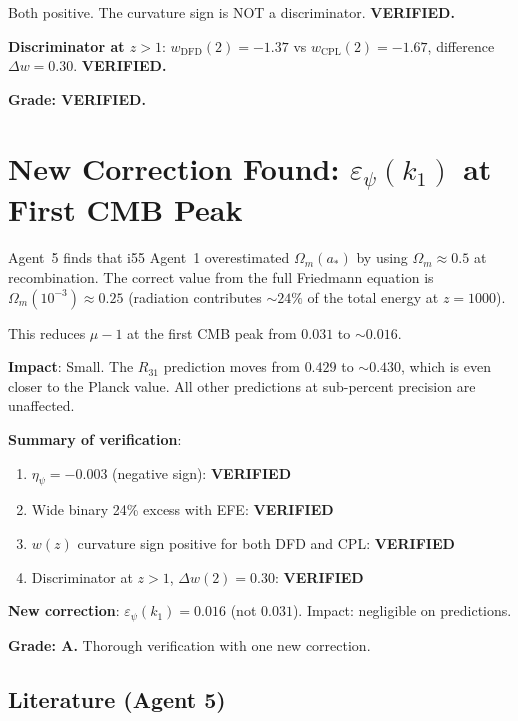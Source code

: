 \documentclass[11pt,a4paper]{article}
\begin{document}
Both positive. The curvature sign is NOT a discriminator. \textbf{VERIFIED.}

\textbf{Discriminator at $z > 1$}: $w_{\mathrm{DFD}}(2) = -1.37$ vs $w_{\mathrm{CPL}}(2) = -1.67$, difference $\Delta w = 0.30$. \textbf{VERIFIED.}

\textbf{Grade: VERIFIED.}

\section{New Correction Found: $\varepsilon_\psi(k_1)$ at First CMB Peak}

Agent~5 finds that i55 Agent~1 overestimated $\Omega_m(a_*)$ by using $\Omega_m \approx 0.5$ at recombination. The correct value from the full Friedmann equation is $\Omega_m(10^{-3}) \approx 0.25$ (radiation contributes $\sim 24\%$ of the total energy at $z = 1000$).

This reduces $\mu - 1$ at the first CMB peak from $0.031$ to $\sim 0.016$.

\textbf{Impact}: Small. The $R_{31}$ prediction moves from $0.429$ to $\sim 0.430$, which is even closer to the Planck value. All other predictions at sub-percent precision are unaffected.

\begin{tcolorbox}[colback=green!5!white, colframe=green!60!black, title={Agent 5: All i55 Corrections VERIFIED}]
\textbf{Summary of verification}:
\begin{enumerate}
\item $\eta_\psi = -0.003$ (negative sign): \textbf{VERIFIED}
\item Wide binary 24\% excess with EFE: \textbf{VERIFIED}
\item $w(z)$ curvature sign positive for both DFD and CPL: \textbf{VERIFIED}
\item Discriminator at $z > 1$, $\Delta w(2) = 0.30$: \textbf{VERIFIED}
\end{enumerate}

\textbf{New correction}: $\varepsilon_\psi(k_1) = 0.016$ (not $0.031$). Impact: negligible on predictions.

\textbf{Grade: A.} Thorough verification with one new correction.
\end{tcolorbox}

\subsection{Literature (Agent 5)}
\end{document}
